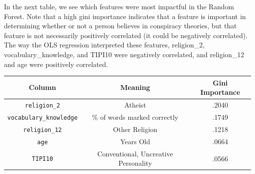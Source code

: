 \documentclass[11pt]{article}
\begin{document}
In the next table, we see which features were most impactful in the
Random Forest. Note that a high gini importance indicates that a feature
is important in determining whether or not a person believes in
conspiracy theories, but that feature is not necessarily positively
correlated (it could be negatively correlated). The way the OLS
regression interpreted these features, religion\_2,
vocabulary\_knowledge, and TIPI10 were negatively correlated, and
religion\_12 and age were positively correlated.

\begin{center}
\begin{tabular}{ |c|c|c| } 
   \hline
   Column & Meaning & Gini Importance \\ 
   \hline
   \verb|religion_2| & Atheist & .2040 \\ 
   \verb|vocabulary_knowledge| & \% of words marked correctly & .1749 \\ 
   \verb|religion_12| & Other Religion & .1218 \\ 
   \verb|age| & Years Old & .0664 \\ 
   \verb|TIPI10| & Conventional, Uncreative Personality & .0566 \\ 
   \hline
\end{tabular}
\end{center}
\end{document}
